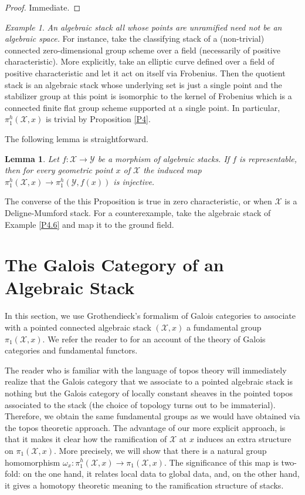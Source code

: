 \documentclass{amsart}
\newtheorem{lem}[thm]{Lemma}
\theoremstyle{definition}
\theoremstyle{remark}
\theoremstyle{remark}
\newtheorem{ex}[thm]{Example}
\newcommand{\X}{\mathcal{X}}
\newcommand{\Y}{\mathcal{Y}}
\newcommand{\ox}{\omega_x}
\newcommand{\pX}{\pi_1(\X,x)}
\newcommand{\phX}{\pi_1^{h}(\X,x)}
\let\:=\colon
\begin{document}
\begin{proof}
Immediate.
\end{proof}


\begin{ex}{\label{P4.6}}{\it An algebraic stack all whose points
are unramified need not be an algebraic space.} For instance, take
the classifying stack of a (non-trivial) connected
zero-dimensional group scheme over a field (necessarily of
positive characteristic). More explicitly, take an elliptic curve
defined over a field of positive characteristic and let it act on
itself via Frobenius. Then the quotient stack is an algebraic
stack whose underlying set is just a single point and the
stabilizer group at this point is isomorphic to the kernel of
Frobenius which is a connected finite flat group scheme supported
at a single point. In particular, $\phX$ is trivial by Proposition
\ref{P4}.
\end{ex}

The following lemma is straightforward.

\begin{lem}{\label{D1}}
Let $f \: \X \to \Y$ be a morphism of algebraic stacks. If $f$ is
representable, then for every geometric point $x$ of $\X$ the
induced map $\phX \to \pi_1^h(\Y,f(x))$ is injective.
\end{lem}


The converse of the this Proposition is true in zero
characteristic, or when $\X$ is a Deligne-Mumford stack. For a
counterexample, take the algebraic stack of Example \ref{P4.6} and
map it to the ground field.

\section{The Galois Category of an Algebraic Stack}{\label{S:Galois}}

In this section, we use Grothendieck's formalism of Galois
categories to associate with a pointed connected algebraic stack
$(\X,x)$ a fundamental group $\pX$. We refer the reader to
\cite{SGA1} for an account of the theory of Galois categories and
fundamental functors.

The reader who is familiar with the language of topos theory will
immediately realize that the Galois category that we associate to
a pointed algebraic stack is nothing but the Galois category of
locally constant sheaves in the pointed topos associated to the
stack (the choice of topology turns out to be immaterial).
Therefore, we obtain the same fundamental groups as we would have
obtained via the topos theoretic approach. The advantage of our
more explicit approach, is that it makes it clear how the
ramification of $\X$ at $x$ induces an extra structure on $\pX$.
More precisely, we will show that there is a natural group
homomorphism $\ox \: \phX \to \pX$. The significance of this map
is two-fold: on the one hand, it relates local data to global
data, and, on the other hand, it gives a homotopy theoretic
meaning to the ramification structure of stacks.
\end{document}
